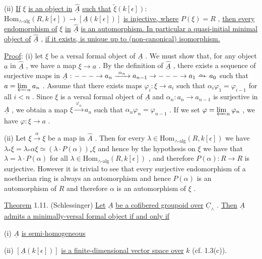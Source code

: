   (ii) \underline{If} $\xi$ \underline{is an object in} $\hat{\underline{A}}$ \underline{such that} $\widetilde{\xi}(k[\epsilon])$: $\mathrm{Hom}_{\wedge\text{-alg}}(R,k[\epsilon])\to [\underline{A}(k[\epsilon])]$ \underline{is injective, where} $P(\xi) = R$ , \underline{then every endomorphism of} $\xi$ \underline{in} $\hat{\underline{A}}$ \underline{is an automorphism. In particular a quasi-initial minimal object of} $\hat{\underline{A}}$ , \underline{if it exists, is unique up to (non-canonical) isomorphism.}

\underline{Proof}: (i) let $\xi$ be a versal formal object of $\underline{A}$ . We must show that, for any object $a$ in $\hat{\underline{A}}$ , we have a map $\xi \to a$ . By the definition of $\hat{\underline{A}}$ , there exists a sequence of surjective maps in $\underline{A}$ : $--- \to a_n \xrightarrow{\ \alpha_n\ } a_{n-1} \to --- \to a_1 \overset{\alpha_1}{\relbar\joinrel\relbar} a_0$ such that $a = \varprojlim_n a_n$ . Assume that there exists maps $\varphi_i : \xi \to a_i$ such that $\alpha_i\varphi_1 = \varphi_{i-1}$ for all $i < n$ . Since $\xi$ is a versal formal object of $\underline{A}$ and $\alpha_n : a_n \to a_{n-1}$ is surjective in $\underline{A}$ , we obtain a map $\xi \xrightarrow{\ \varphi_n\ } a_n$ such that $\alpha_n\varphi_n = \varphi_{n-1}$ . If we set $\varphi = \varprojlim_n \varphi_n$ , we have $\varphi : \xi \to a$ .

(ii) Let $\xi \xrightarrow{\ \alpha\ } \xi$ be a map in $\hat{A}$ . Then for every $\lambda \in \mathrm{Hom}_{\wedge\text{-alg}}(R,k[\epsilon])$ we have $\lambda_*\xi = \lambda_*\alpha\xi \simeq (\lambda\cdot P(\alpha))_*\xi$ and hence by the hypothesis on $\xi$ we have that $\lambda = \lambda\cdot P(\alpha)$ for all $\lambda \in \mathrm{Hom}_{\wedge\text{-alg}}(R,k[\epsilon])$ , and therefore $P(\alpha) : R \to R$ is surjective. However it is trivial to see that every surjective endomorphism of a noetherian ring is always an automorphism and hence $P(\alpha)$ is an automorphism of $R$ and therefore $\alpha$ is an automorphism of $\xi$ .

\underline{Theorem} 1.11. (Schlessinger) \underline{Let} $\underline{A}$ \underline{be a cofibered groupoid over} $\underline{C}_{\wedge}$ . \underline{Then} $\underline{A}$
\underline{admits a minimally-versal formal object if and only if}

  (i)  $\underline{A}$  \underline{is semi-homogeneous}

  (ii)  $[\underline{A}(k[\epsilon])]$  \underline{is a finite-dimensional vector space over}  $k$  (cf. 1.3(c)).

